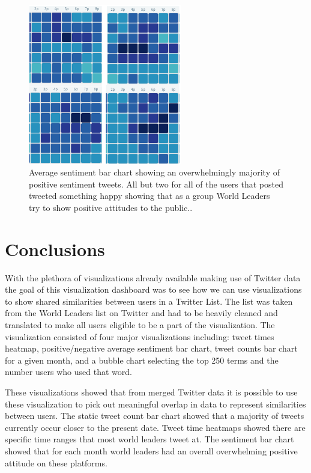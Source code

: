 \documentclass[journal]{vgtc}                %
\begin{document}
\begin{figure}[tb]
 \centering %
 \includegraphics[height=7cm,width=\columnwidth, keepaspectratio]{imgs/heatmap-dense.png}
 \caption{Average sentiment bar chart showing an overwhelmingly majority of positive sentiment tweets. All but two for all of the users that posted tweeted something happy showing that as a group World Leaders try to show positive attitudes to the public.. }
 \label{fig:hmap-dense}
\end{figure}


\section{Conclusions}

With the plethora of visualizations already available making use of Twitter data the goal of this visualization dashboard was to see how we can use visualizations to show shared similarities between users in a Twitter List.
The list was taken from the World Leaders list on Twitter \cite{twit-worldlist} and had to be heavily cleaned and translated to make all users eligible to be a part of the visualization.
The visualization consisted of four major visualizations including: tweet times heatmap, positive/negative average sentiment bar chart, tweet counts bar chart for a given month, and a bubble chart selecting the top 250 terms and the number users who used that word.

These visualizations showed that from merged Twitter data it is possible to use these visualization to pick out meaningful overlap in data to represent similarities between users.
The static tweet count bar chart showed that a majority of tweets currently occur closer to the present date.
Tweet time heatmaps showed there are specific time ranges that most world leaders tweet at.
The sentiment bar chart showed that for each month world leaders had an overall overwhelming positive attitude on these platforms.
\end{document}
